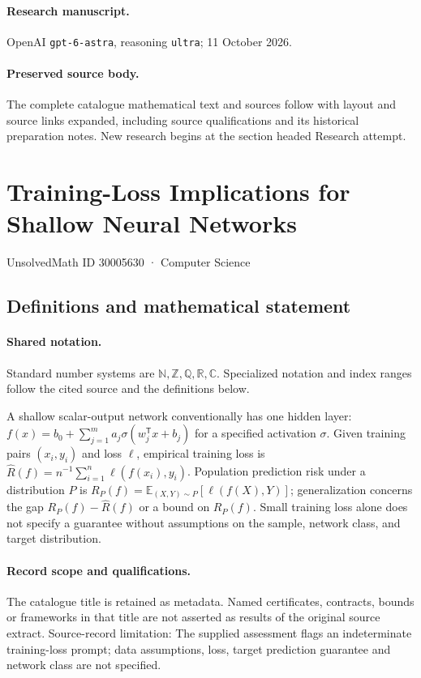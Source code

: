 \documentclass[11pt]{article}
\begin{document}
\paragraph{Research manuscript.} OpenAI \texttt{gpt-6-astra}, reasoning \texttt{ultra}; 11 October 2026.
\paragraph{Preserved source body.} The complete catalogue mathematical text and sources follow with layout and source links expanded, including source qualifications and its historical preparation notes. New research begins at the section headed Research attempt.

\section{Training-Loss Implications for Shallow Neural Networks}\label{30005630}
{\small UnsolvedMath ID 30005630 · Computer Science}
\subsection{Definitions and mathematical statement}

\paragraph{Shared notation.}Standard number systems are $\mathbb N,\mathbb Z,\mathbb Q,\mathbb R,\mathbb C$. Specialized notation and index ranges follow the cited source and the definitions below.


A shallow scalar-output network conventionally has one hidden layer: $f(x)=b_0+\sum_{j=1}^m a_j\sigma(w_j^{\mathsf T}x+b_j)$ for a specified activation $\sigma$. Given training pairs $(x_i,y_i)$ and loss $\ell$, empirical training loss is $\widehat R(f)=n^{-1}\sum_{i=1}^n\ell(f(x_i),y_i)$. Population prediction risk under a distribution $P$ is $R_P(f)=\mathbb E_{(X,Y)\sim P}[\ell(f(X),Y)]$; generalization concerns the gap $R_P(f)-\widehat R(f)$ or a bound on $R_P(f)$. Small training loss alone does not specify a guarantee without assumptions on the sample, network class, and target distribution.
\paragraph{Record scope and qualifications.}
The catalogue title is retained as metadata. Named certificates, contracts, bounds or frameworks in that title are not asserted as results of the original source extract.
Source-record limitation: The supplied assessment flags an indeterminate training-loss prompt; data assumptions, loss, target prediction guarantee and network class are not specified.
\end{document}
